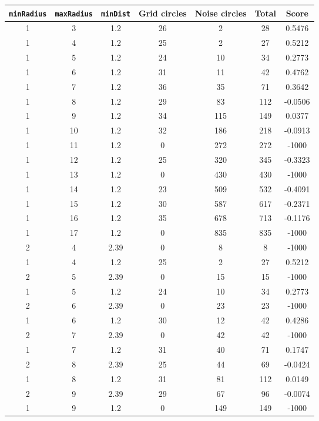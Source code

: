 \documentclass[letterpaper, 12pt]{article}
\begin{document}
\begin{longtable}{|c|c|c|c|c|c|c|}
\hline
\textbf{\texttt{minRadius}} & \textbf{\texttt{maxRadius}} & \textbf{\texttt{minDist}} & \textbf{Grid circles} & \textbf{Noise circles} & \textbf{Total} & \textbf{Score} \\
\hline
1 & 3 & 1.2 & 26 & 2 & 28 & 0.5476 \\
\hline
1 & 4 & 1.2 & 25 & 2 & 27 & 0.5212 \\
\hline
1 & 5 & 1.2 & 24 & 10 & 34 & 0.2773 \\
\hline
1 & 6 & 1.2 & 31 & 11 & 42 & 0.4762 \\
\hline
1 & 7 & 1.2 & 36 & 35 & 71 & 0.3642 \\
\hline
1 & 8 & 1.2 & 29 & 83 & 112 & -0.0506 \\
\hline
1 & 9 & 1.2 & 34 & 115 & 149 & 0.0377 \\
\hline
1 & 10 & 1.2 & 32 & 186 & 218 & -0.0913 \\
\hline
1 & 11 & 1.2 & 0 & 272 & 272 & -1000 \\
\hline
1 & 12 & 1.2 & 25 & 320 & 345 & -0.3323 \\
\hline
1 & 13 & 1.2 & 0 & 430 & 430 & -1000 \\
\hline
1 & 14 & 1.2 & 23 & 509 & 532 & -0.4091 \\
\hline
1 & 15 & 1.2 & 30 & 587 & 617 & -0.2371 \\
\hline
1 & 16 & 1.2 & 35 & 678 & 713 & -0.1176 \\
\hline
1 & 17 & 1.2 & 0 & 835 & 835 & -1000 \\
\hline
2 & 4 & 2.39 & 0 & 8 & 8 & -1000 \\
\hline
1 & 4 & 1.2 & 25 & 2 & 27 & 0.5212 \\
\hline
2 & 5 & 2.39 & 0 & 15 & 15 & -1000 \\
\hline
1 & 5 & 1.2 & 24 & 10 & 34 & 0.2773 \\
\hline
2 & 6 & 2.39 & 0 & 23 & 23 & -1000 \\
\hline
1 & 6 & 1.2 & 30 & 12 & 42 & 0.4286 \\
\hline
2 & 7 & 2.39 & 0 & 42 & 42 & -1000 \\
\hline
1 & 7 & 1.2 & 31 & 40 & 71 & 0.1747 \\
\hline
2 & 8 & 2.39 & 25 & 44 & 69 & -0.0424 \\
\hline
1 & 8 & 1.2 & 31 & 81 & 112 & 0.0149 \\
\hline
2 & 9 & 2.39 & 29 & 67 & 96 & -0.0074 \\
\hline
1 & 9 & 1.2 & 0 & 149 & 149 & -1000 \\

\end{longtable}
\end{document}
